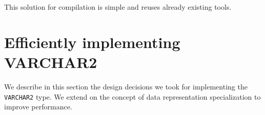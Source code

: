 \documentclass[twoside,11pt,a4paper]{article}
\newcommand{\pls}[1]{\small\texttt{#1}\normalsize}
\newcommand{\plstype}[1]{\pls{#1}}
\newcommand{\varchar}{\plstype{VARCHAR2}}
\newcommand{\startsection}[1]{
	\cleardoublepage
	\section{#1}
	\thispagestyle{basic}
}
\begin{document}
This solution for compilation is simple and reuses already existing tools.



\startsection{Efficiently implementing VARCHAR2}
\label{sec:varcharimpl}

We describe in this section the design decisions we took for implementing the \varchar{} type. We extend on the concept of data representation specialization to improve performance.

\end{document}
